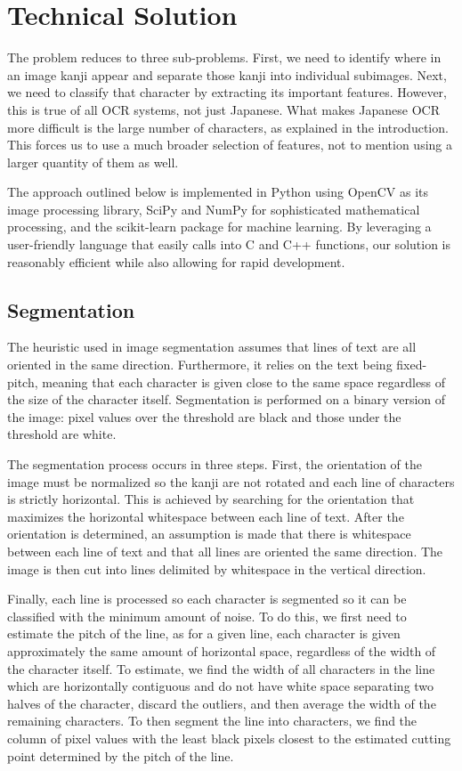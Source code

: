 \documentclass[10pt,twocolumn,letterpaper]{article}
\begin{document}
\section{Technical Solution}
The problem reduces to three sub-problems. First, we need to identify where in an image kanji appear and separate those kanji into individual subimages. Next, we need to classify that character by extracting its important features. However, this is true of all OCR systems, not just Japanese. What makes Japanese OCR more difficult is the large number of characters, as explained in the introduction. This forces us to use a much broader selection of features, not to mention using a larger quantity of them as well.

The approach outlined below is implemented in Python using OpenCV as its image processing library, SciPy and NumPy for sophisticated mathematical processing, and the scikit-learn package for machine learning. By leveraging a user-friendly language that easily calls into C and C++ functions, our solution is reasonably efficient while also allowing for rapid development.


\subsection{Segmentation}
The heuristic used in image segmentation assumes that lines of text are all oriented in the same direction. Furthermore, it relies on the text being fixed-pitch, meaning that each character is given close to the same space regardless of the size of the character itself. Segmentation is performed on a binary version of the image: pixel values over the threshold are black and those under the threshold are white.

The segmentation process occurs in three steps. First, the orientation of the image must be normalized so the kanji are not rotated and each line of characters is strictly horizontal. This is achieved by searching for the orientation that maximizes the horizontal whitespace between each line of text.  After the orientation is determined, an assumption is made that there is whitespace between each line of text and that all lines are oriented the same direction. The image is then cut into lines delimited by whitespace in the vertical direction.

Finally, each line is processed so each character is segmented so it can be classified with the minimum amount of noise. To do this, we first need to estimate the pitch of the line, as for a given line, each character is given approximately the same amount of horizontal space, regardless of the width of the character itself. To estimate, we find the width of all characters in the line which are horizontally contiguous and do not have white space separating two halves of the character, discard the outliers, and then average the width of the remaining characters. To then segment the line into characters, we find the column of pixel values with the least black pixels closest to the estimated cutting point determined by the pitch of the line.
\end{document}
